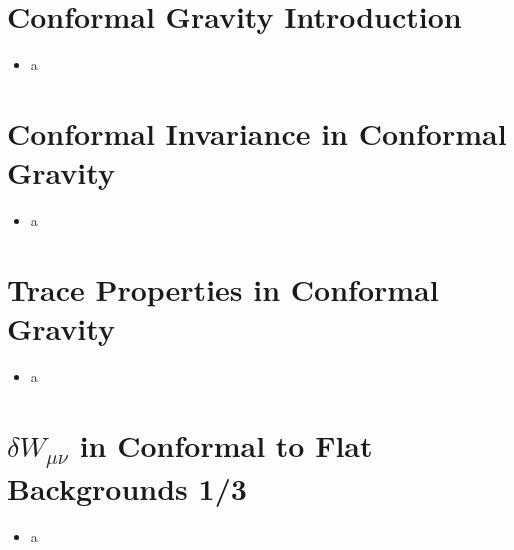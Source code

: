 \documentclass[10pt,letterpaper]{article}
\numberwithin{equation}{section}
\begin{document}

\section{Conformal Gravity Introduction}
\begin{itemize}
	\item a
\end{itemize}


\section{Conformal Invariance in Conformal Gravity}
\begin{itemize}
	\item a
\end{itemize}


\section{Trace Properties in Conformal Gravity}
\begin{itemize}
	\item a
\end{itemize}


\section{$\delta W_{\mu\nu}$ in Conformal to Flat Backgrounds 1/3}
\begin{itemize}
	\item a
\end{itemize}

\end{document}
